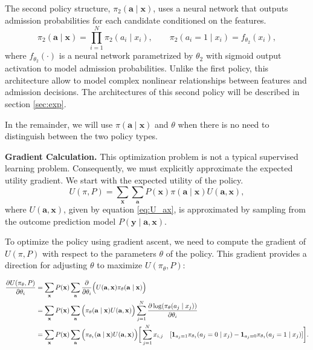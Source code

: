 \documentclass[acmlarge]{acmart-ecaf}
\newcommand {\pop} {N}
\newcommand {\Pfeat} {\mathbf{x}}
\newcommand {\pol} {\pi}
\newcommand {\Pact} {\mathbf{a}}
\newcommand {\Pout} {\mathbf{y}}
\begin{document}
The second policy structure, $\pol_2(\Pact \mid \Pfeat)$, uses a neural network that outputs admission probabilities for each candidate conditioned on the features.
\begin{equation}
\pol_2(\Pact \mid \Pfeat) = \prod_{i=1}^\pop \pol_2(a_i \mid x_i), \qquad \pol_2(a_i = 1 \mid x_i) = f_{\theta_2}(x_i),
\end{equation}
where $f_{\theta_2}(\cdot)$ is a neural network parametrized by $\theta_2$ with sigmoid output activation to model admission probabilities. Unlike the first policy, this architecture allow to model complex nonlinear relationships between features and admission decisions. The architectures of this second policy will be described in section \ref{sec:exp}.

In the remainder, we will use \( \pol(\Pact \mid \Pfeat) \) and  \(\theta \)  when there is no need to distinguish between the two policy types.

\textbf{Gradient Calculation.} This optimization problem is not a typical supervised learning problem. Consequently, we must explicitly approximate the expected utility gradient. We start with the expected utility of the policy.
\begin{equation}
U(\pol, P) = \sum_\Pfeat \sum_\Pact P(\Pfeat) \pol(\Pact \mid \Pfeat) U(\Pact, \Pfeat),
\end{equation}
where $U(\Pact, \Pfeat)$, given by equation \ref{eq:U_ax}, is approximated by sampling from the outcome prediction model  $P(\Pout \mid \Pact, \Pfeat)$.

To optimize the policy using gradient ascent, we need to compute the gradient of \( U(\pol, P) \) with respect to the parameters \( \theta \) of the policy. This gradient provides a direction for adjusting \( \theta \) to maximize \( U(\pol_\theta, P) \):

\begin{align} \label{eq: der}
  \frac{\partial U(\pol_\theta, P)}{\partial \theta_i} &= \sum_\Pfeat P(\Pfeat) \sum_\Pact \frac{\partial }{\partial \theta_i}  \Big(U(\Pact, \Pfeat) \pol_{\theta}(\Pact \mid \Pfeat)\Big) \notag \\
&= \sum_\Pfeat P(\Pfeat) \sum_\Pact \Big(\pol_{\theta}(\Pact \mid \Pfeat) U(\Pact, \Pfeat)\Big) \sum_{j=1}^N \frac{\partial \log(\pol_{\theta}(a_j\mid x_j))}{\partial \theta_i}  \\
&=  \sum_\Pfeat P(\Pfeat) \sum_\Pact \Big( \pol_{\theta_1}(\Pact \mid \Pfeat) U(\Pact, \Pfeat)\Big) \bigg[ \sum_{j=1}^N x_{i,j} 
  \quad  [\mathbf{1}_{a_j=1}  \pol_{\theta_1}(a_j =0 \mid x_j) \notag  -  \mathbf{1}_{a_j=0}  \pol_{\theta_1}(a_j =1 \mid x_j) ]\bigg].\notag
\end{align}
\end{document}
